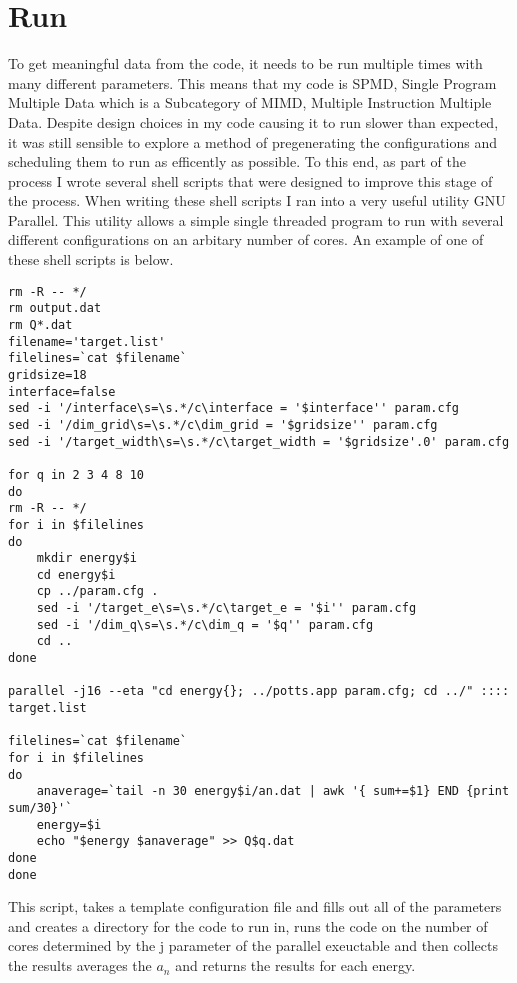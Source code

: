 \section{Run}
To get meaningful data from the code, it needs to be run multiple times with many different parameters.
This means that my code is SPMD, Single Program Multiple Data which is a Subcategory of MIMD, Multiple Instruction Multiple Data.
Despite design choices in my code causing it to run slower than expected, it was still sensible to explore a method of pregenerating the configurations and scheduling them to run as efficently as possible.
To this end, as part of the process I wrote several shell scripts that were designed to improve this stage of the process.
When writing these shell scripts I ran into a very useful utility GNU Parallel\cite{Tange2011a}.
This utility allows a simple single threaded program to run with several different configurations on an arbitary number of cores.
An example of one of these shell scripts is below.
\begin{lstlisting}[breaklines]
rm -R -- */
rm output.dat
rm Q*.dat
filename='target.list'
filelines=`cat $filename`
gridsize=18
interface=false
sed -i '/interface\s=\s.*/c\interface = '$interface'' param.cfg
sed -i '/dim_grid\s=\s.*/c\dim_grid = '$gridsize'' param.cfg
sed -i '/target_width\s=\s.*/c\target_width = '$gridsize'.0' param.cfg

for q in 2 3 4 8 10
do
rm -R -- */
for i in $filelines
do
	mkdir energy$i
    cd energy$i
    cp ../param.cfg .
    sed -i '/target_e\s=\s.*/c\target_e = '$i'' param.cfg
    sed -i '/dim_q\s=\s.*/c\dim_q = '$q'' param.cfg
    cd ..
done

parallel -j16 --eta "cd energy{}; ../potts.app param.cfg; cd ../" :::: target.list
 
filelines=`cat $filename`
for i in $filelines
do
	anaverage=`tail -n 30 energy$i/an.dat | awk '{ sum+=$1} END {print sum/30}'`
    energy=$i
    echo "$energy $anaverage" >> Q$q.dat
done
done
\end{lstlisting}

This script, takes a template configuration file and fills out all of the parameters and creates a directory for the code to run in, runs the code on the number of cores determined by the \-j parameter of the parallel exeuctable and then collects the results averages the $a_n$ and returns the results for each energy.


